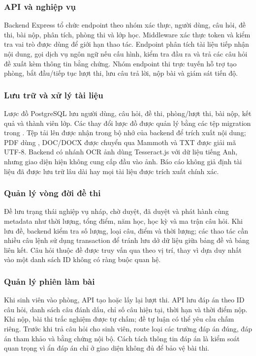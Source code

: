 \subsubsection{API và nghiệp vụ}
Backend Express tổ chức endpoint theo nhóm xác thực, người dùng, câu hỏi,
đề thi, bài nộp, phân tích, phòng thi và lớp học. Middleware xác thực token
và kiểm tra vai trò được dùng để giới hạn thao tác. Endpoint phân tích tài
liệu tiếp nhận nội dung, gọi dịch vụ ngôn ngữ nếu cấu hình, kiểm tra đầu ra
và trả các câu hỏi đề xuất kèm thông tin bằng chứng. Nhóm endpoint thi trực
tuyến hỗ trợ tạo phòng, bắt đầu/tiếp tục lượt thi, lưu câu trả lời, nộp bài
và giám sát tiến độ.

\subsubsection{Lưu trữ và xử lý tài liệu}
Lược đồ PostgreSQL lưu người dùng, câu hỏi, đề thi, phòng/lượt thi, bài nộp,
kết quả và thành viên lớp. Các thay đổi lược đồ được quản lý bằng các tệp
migration trong . Tệp tải lên được nhận trong bộ
nhớ của backend để trích xuất nội dung; PDF dùng , DOC/DOCX
được chuyển qua Mammoth và TXT được giải mã UTF-8. Backend có nhánh OCR ảnh
dùng Tesseract.js với dữ liệu tiếng Anh, nhưng giao diện hiện không cung cấp
đầu vào ảnh. Báo cáo không giả định tài liệu đã được lưu trữ lâu dài hay
mọi tài liệu được trích xuất chính xác.

\subsubsection{Quản lý vòng đời đề thi}
Đề lưu trạng thái nghiệp vụ nháp, chờ duyệt, đã duyệt và phát hành cùng
metadata như thời lượng, tổng điểm, năm học, học kỳ và ma trận câu hỏi. Khi
lưu đề, backend kiểm tra số lượng, loại câu, điểm và thời lượng; các thao
tác cần nhiều câu lệnh sử dụng transaction để tránh lưu dở dữ liệu giữa
bảng đề và bảng liên kết. Câu hỏi thuộc đề được truy vấn qua
 theo vị trí, thay vì dựa duy nhất vào một danh sách
ID không có ràng buộc quan hệ.

\subsubsection{Quản lý phiên làm bài}
Khi sinh viên vào phòng, API tạo hoặc lấy lại lượt thi. API lưu đáp án theo
ID câu hỏi, danh sách câu đánh dấu, chỉ số câu hiện tại, thời hạn và thời
điểm nộp. Khi nộp, bài thi trắc nghiệm được tự chấm; đề tự luận có thể yêu
cầu chấm riêng. Trước khi trả câu hỏi cho sinh viên, route loại các trường
đáp án đúng, đáp án tham khảo và bằng chứng nội bộ. Cách tách thông tin
đáp án là kiểm soát quan trọng vì ẩn đáp án chỉ ở giao diện không đủ để
bảo vệ bài thi.


